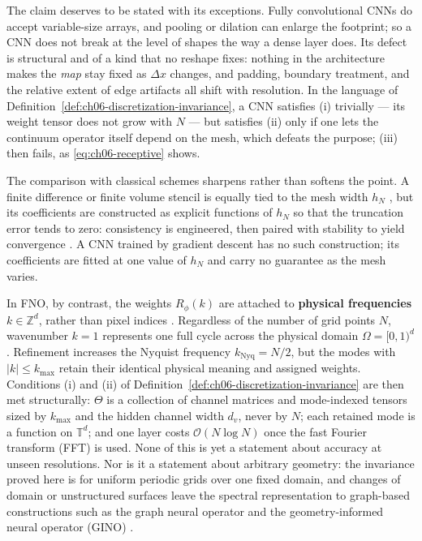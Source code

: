 The claim deserves to be stated with its exceptions. Fully convolutional CNNs do
accept variable-size arrays, and pooling or dilation can enlarge the footprint;
so a CNN does not break at the level of shapes the way a dense layer does. Its
defect is structural and of a kind that no reshape fixes: nothing in the
architecture makes the \emph{map} stay fixed as $\Delta x$ changes, and padding,
boundary treatment, and the relative extent of edge artifacts all shift with
resolution. In the language of
Definition~\ref{def:ch06-discretization-invariance}, a CNN satisfies (i)
trivially --- its weight tensor does not grow with $N$ --- but satisfies (ii)
only if one lets the continuum operator itself depend on the mesh, which
defeats the purpose; (iii) then fails, as \eqref{eq:ch06-receptive}
shows.

The comparison with classical schemes sharpens rather than softens the point. A
finite difference or finite volume stencil is equally tied to the mesh width
$h_N$
\cite{leveque2002finite}, but its coefficients are constructed as explicit
functions of $h_N$ so that the truncation error tends to zero: consistency is
engineered, then paired with stability to yield convergence
\cite{quarteroni2008numerical}.
A CNN trained by gradient descent has no such construction; its coefficients are
fitted at one value of $h_N$ and carry no guarantee as the mesh varies.

In FNO, by contrast, the weights $R_\phi(k)$ are attached to \textbf{physical
frequencies} $k \in \mathbb{Z}^d$, rather than pixel indices
\cite{li2021fourier}. Regardless of the number of grid points $N$, wavenumber
$k=1$ represents one full cycle across the physical domain
$\Omega = [0, 1)^d$. Refinement increases the Nyquist frequency
$k_{\text{Nyq}} = N/2$, but the modes with $|k| \le k_{\max}$ retain their identical
physical meaning and assigned
weights. Conditions
(i) and (ii) of Definition~\ref{def:ch06-discretization-invariance} are then met
structurally: $\Theta$ is a collection of channel matrices and mode-indexed
tensors sized by $k_{\max}$ and the hidden channel width $d_v$, never by $N$; each retained mode is a
function on $\mathbb{T}^d$; and one layer costs $\mathcal{O}(N\log N)$ once the
fast Fourier transform (FFT) is used. None of this is yet a statement about
accuracy at unseen resolutions. Nor is it a statement about arbitrary geometry:
the invariance proved here is for uniform periodic grids over one fixed domain,
and changes of domain or unstructured surfaces leave the spectral representation
to graph-based constructions such as the graph neural operator and the
geometry-informed neural operator (GINO) \cite{li2023geometry}.

